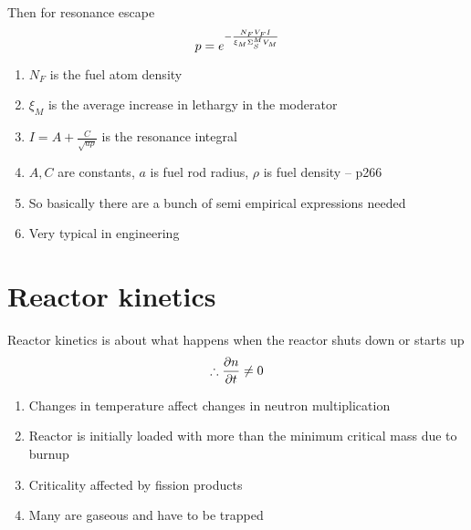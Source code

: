 \documentclass[aspectratio=1610,pdftex,dvipsnames,compress,xcolor={dvipsnames}]{beamer}
\begin{document}
\begin{frame}{Then for resonance escape}
    \begin{equation}
        \LARGE
        p = e^{-\frac{N_F V_F I}{\xi_M \Sigma_S^M V_M}}
    \end{equation}

    \vspace*{\fill}

    \begin{enumerate}[series=outerlist,topsep=0pt,itemsep=21pt,leftmargin=*,label=(\arabic*)]
        \item[]$N_F$ is the fuel atom density
        \item[]$\xi_M$ is the average increase in lethargy in the moderator
        \item[]$I = A + \frac{C}{\sqrt{a\rho}}$ is the resonance integral
        \item[]$A,C$ are constants, $a$ is fuel rod radius, $\rho$ is fuel density -- p266
        \item[]So basically there are a bunch of semi empirical expressions needed
        \item[]Very typical in engineering
    \end{enumerate}
\end{frame}


\section{Reactor kinetics}


\addtocounter{framenumber}{-1} 
\begin{frame}{Reactor kinetics is about what happens when the reactor shuts down or starts up}
    \begin{equation}
        \LARGE
        \therefore \frac{\partial{n}}{\partial{t}} \neq 0
    \end{equation}

    \vspace*{\fill}

    \begin{enumerate}[series=outerlist,topsep=0pt,itemsep=21pt,leftmargin=*,label=(\arabic*)]
        \item[]Changes in temperature affect changes in neutron multiplication
        \item[]Reactor is initially loaded with more than the minimum critical mass due to burnup
        \item[]Criticality affected by fission products
        \item[]Many are gaseous and have to be trapped
    \end{enumerate}
\end{frame}
\end{document}
